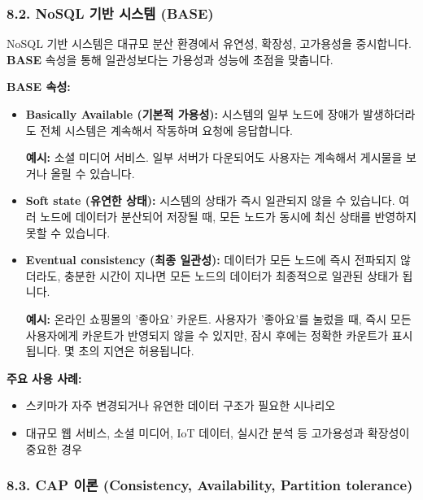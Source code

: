 \documentclass[11pt,a4paper]{article}
\theoremstyle{definition}
\begin{document}
\subsubsection*{8.2. NoSQL 기반 시스템 (BASE)}

\begin{summarybox}
NoSQL 기반 시스템은 대규모 분산 환경에서 유연성, 확장성, 고가용성을 중시합니다. \textbf{BASE} 속성을 통해 일관성보다는 가용성과 성능에 초점을 맞춥니다.
\end{summarybox}

\textbf{BASE 속성:}
\begin{itemize}
    \item \textbf{Basically Available (기본적 가용성):} 시스템의 일부 노드에 장애가 발생하더라도 전체 시스템은 계속해서 작동하며 요청에 응답합니다.
    \begin{examplebox}
    \textbf{예시:} 소셜 미디어 서비스. 일부 서버가 다운되어도 사용자는 계속해서 게시물을 보거나 올릴 수 있습니다.
    \end{examplebox}
    \item \textbf{Soft state (유연한 상태):} 시스템의 상태가 즉시 일관되지 않을 수 있습니다. 여러 노드에 데이터가 분산되어 저장될 때, 모든 노드가 동시에 최신 상태를 반영하지 못할 수 있습니다.
    \item \textbf{Eventual consistency (최종 일관성):} 데이터가 모든 노드에 즉시 전파되지 않더라도, 충분한 시간이 지나면 모든 노드의 데이터가 최종적으로 일관된 상태가 됩니다.
    \begin{examplebox}
    \textbf{예시:} 온라인 쇼핑몰의 '좋아요' 카운트. 사용자가 '좋아요'를 눌렀을 때, 즉시 모든 사용자에게 카운트가 반영되지 않을 수 있지만, 잠시 후에는 정확한 카운트가 표시됩니다. 몇 초의 지연은 허용됩니다.
    \end{examplebox}
\end{itemize}

\textbf{주요 사용 사례:}
\begin{itemize}
    \item 스키마가 자주 변경되거나 유연한 데이터 구조가 필요한 시나리오
    \item 대규모 웹 서비스, 소셜 미디어, IoT 데이터, 실시간 분석 등 고가용성과 확장성이 중요한 경우
\end{itemize}

\subsubsection*{8.3. CAP 이론 (Consistency, Availability, Partition tolerance)}
\end{document}
